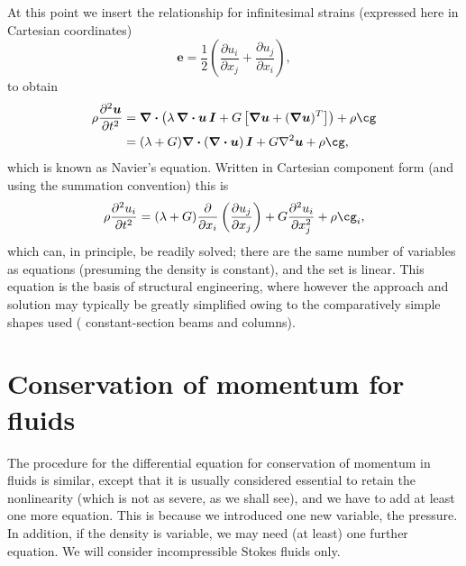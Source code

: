 \documentclass[a4paper,11pt]		{report}
\begin{document}
At this point we insert the relationship for infinitesimal strains
(expressed here in Cartesian coordinates)
\[
\bm{e}=\frac{1}{2}\left(\frac{\partial u_i}{\partial x_j} + 
                        \frac{\partial u_j}{\partial x_i}\right),
\]
to obtain 
\begin{align}
\rho\frac{\partial^2 \bm{u}}{\partial t^2}
&=
\bm{\nabla\cdot}\left(\lambda\,\bm{\nabla\cdot u\,I} +
G\left[\bm{\nabla u} + (\bm{\nabla u})^T\right]\right) +
\rho\bm{\cg}\\
&=
(\lambda + G) \bm{\nabla\cdot}\left(\bm{\nabla\cdot u}\right)\bm{I} +
G\nabla^2\bm{u} +
\rho\bm{\cg},
\end{align}
which is known as Navier's equation.  Written in Cartesian component
form (and using the summation convention) this is
\begin{equation}
\rho\frac{\partial^2 u_i}{\partial t^2}
=
(\lambda + G) \frac{\partial}{\partial x_i}\left(
\frac{\partial u_j}{\partial x_j}\right) +
G\frac{\partial^2 u_i}{\partial x_j^2} +
\rho\cg_i,
\end{equation}
which can, in principle, be readily solved; there are the same number
of variables as equations (presuming the density is constant), and the
set is linear. This equation is the basis of structural engineering,
where however the approach and solution may typically be greatly
simplified owing to the comparatively simple shapes used (\eg
constant-section beams and columns).


\section{Conservation of momentum for fluids}

The procedure for the differential equation for conservation of
momentum in fluids is similar, except that it is usually considered
essential to retain the nonlinearity (which is not as severe, as we
shall see), and we have to add at least one more equation. This is
because we introduced one new variable, the pressure. In addition, if
the density is variable, we may need (at least) one further equation.
We will consider incompressible Stokes fluids only.
\end{document}
